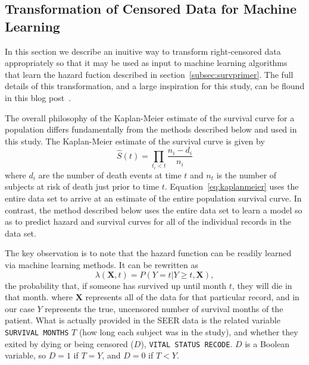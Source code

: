 \documentclass[a4paper,11pt]{article}
\newcommand{\codewhite}[1]{\colorbox{white}{\texttt{#1}}}
\begin{document}












\subsection{Transformation of Censored Data for Machine Learning}
\label{subsec:transformation}

In this section we describe an inuitive way to transform right-censored data appropriately so that it may be used as input to machine learning algorithms that learn the hazard fuction described in section~\ref{subsec:survprimer}. The full details of this transformation, and a large inspiration for this study, can be flound in this blog post~\cite{kuhn}.

The overall philosophy of the Kaplan-Meier estimate of the survival curve for a population differs fundamentally from the methods described below and used in this study. 
The Kaplan-Meier estimate of the survival curve is given by
\begin{equation}
\label{eq:kaplanmeier}
\hat{S}(t) = \prod_{t_i < t} \frac{n_i - d_i}{n_i}
\end{equation}
where $d_i$ are the number of death events at time $t$ and $n_t$ is the number of subjects at risk of death just prior to time $t$. 
Equation~\ref{eq:kaplanmeier} uses the entire data set to arrive at an estimate of the entire population survival curve. In contrast, the method described below uses the entire data set to learn a model so as to predict hazard and survival curves for all of the individual records in the data set.

The key observation is to note that the hazard function can be readily learned via machine learning methods. It can be rewritten as
\begin{equation}
\label{eq:hhazard}
\lambda(\mathbf{X}, t) = P(Y = t|Y \geq t, \mathbf{X}),
\end{equation}
the probability that, if someone has survived up until month $t$, they will die in that month.
where $\mathbf{X}$ represents all of the data for that particular record, and in our case $Y$ represents the true, uncensored number of survival months of the patient.
What is actually provided in the SEER data is the related variable \codewhite{SURVIVAL MONTHS} $T$ (how long each subject was in the study), and whether they exited by dying or being censored ($D$), \codewhite{VITAL STATUS RECODE}. 
$D$ is a Boolean variable, so $D = 1$ if $T = Y$, and $D = 0$ if $T < Y$.
\end{document}

